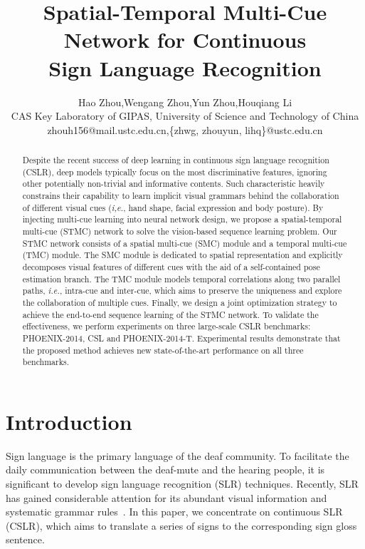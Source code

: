 \documentclass[letterpaper]{article} %
\title{Spatial-Temporal Multi-Cue Network for Continuous \\ Sign Language Recognition}
\author{Hao Zhou,\quad Wengang Zhou,\quad Yun Zhou,\quad Houqiang Li\\
CAS Key Laboratory of GIPAS, University of Science and Technology of China \\
zhouh156@mail.ustc.edu.cn,\quad \{zhwg, zhouyun, lihq\}@ustc.edu.cn\\
}
\begin{document}
\maketitle

\begin{abstract}
Despite the recent success of deep learning in continuous sign language recognition (CSLR), deep models typically focus on the most discriminative features, ignoring other potentially non-trivial and informative contents.
Such characteristic heavily constrains their capability to learn implicit visual grammars behind the collaboration of different visual cues (\emph{i,e.}, hand shape, facial expression and body posture).
By injecting multi-cue learning into neural network design,
we propose a spatial-temporal multi-cue (STMC) network to solve the vision-based sequence learning problem.
Our STMC network consists of a spatial multi-cue (SMC) module and a temporal multi-cue (TMC) module.
The SMC module is dedicated to spatial representation and explicitly decomposes visual features of different cues with the aid of a self-contained pose estimation branch.
The TMC module models temporal correlations along two parallel paths, \emph{i.e.}, intra-cue and inter-cue,
which aims to preserve the uniqueness and explore the collaboration of multiple cues.
Finally, we design a joint optimization strategy to achieve the end-to-end sequence learning of the STMC network.
To validate the effectiveness,
we perform experiments on three large-scale CSLR benchmarks:
PHOENIX-2014, CSL and PHOENIX-2014-T.
Experimental results demonstrate that the proposed method achieves new state-of-the-art performance on all three benchmarks.
\end{abstract}

\section{Introduction}
Sign language is the primary language of the deaf community.
To facilitate the daily communication between the deaf-mute and the hearing people, it is significant to develop sign language recognition (SLR) techniques.
Recently, SLR has gained considerable attention for its abundant visual information and systematic grammar rules~\cite{staged,han,tpami19,ian,aaai2019skeleton}.
In this paper, we concentrate on continuous SLR (CSLR), which aims to translate a series of signs to the corresponding sign gloss sentence.
\end{document}
